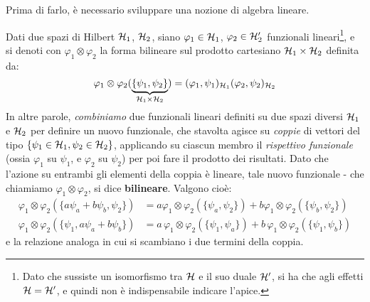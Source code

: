 \documentclass[../../FisicaTeorica.tex]{subfiles}
\begin{document}
\begin{comment}
Partendo da due particelle con funzioni d'onda $\psi_1(\vec{x}^{(1)}) \in L^2(\bb{R}^3,d^3x)$  e $\psi(\vec{x}^{(2)})\in L^2(\bb{R}^3, d^3x)$, il sistema composto da entrambe avrà una funzione d'onda $\psi(\vec{x}^{(1)}, \vec{x}^{(2)}) \in L^2(\bb{R}^6, d^3x^{(1)},d^3x^{(2)})$. Qual è la relazione tra quest'ultima $\psi$ \q{composta} e le due \q{singole}?\\
\end{comment}
Prima di farlo, è necessario sviluppare una nozione di algebra lineare.\\
\begin{dfn}
Dati due spazi di Hilbert $\mathcal{H}_1$, $\mathcal{H}_2$, siano $\varphi_1 \in \mathcal{H}_1$, $\varphi_2\in \mathcal{H}_2'$ funzionali lineari\footnote{Dato che sussiste un isomorfismo tra $\mathcal{H}$ e il suo duale $\mathcal{H}'$, si ha che agli effetti $\mathcal{H}=\mathcal{H}'$, e quindi non è indispensabile indicare l'apice.}, e si denoti con $\varphi_1 \otimes \varphi_2$ la forma bilineare sul prodotto cartesiano $\mathcal{H}_1 \times \mathcal{H}_2$ definita da:
\begin{equation}
\varphi_1 \otimes \varphi_2 (\underbrace{\{\psi_1, \psi_2\}}_{\mathcal{H}_1 \times \mathcal{H}_2})=(\varphi_1, \psi_1)_{\mathcal{H}_1} (\varphi_2, \psi_2)_{\mathcal{H}_2}
\label{eqn:forma-bilineare}
\end{equation}
In altre parole, \textit{combiniamo} due funzionali lineari definiti su due spazi diversi $\mathcal{H}_1$ e $\mathcal{H}_2$ per definire un nuovo funzionale, che stavolta agisce su \textit{coppie} di vettori del tipo $\{\psi_1 \in \mathcal{H}_1, \psi_2 \in \mathcal{H}_2\}$, applicando su ciascun membro il \textit{rispettivo funzionale} (ossia $\varphi_1$ su $\psi_1$, e $\varphi_2$ su $\psi_2$) per poi fare il prodotto dei risultati. Dato che l'azione su entrambi gli elementi della coppia è lineare, tale nuovo funzionale - che chiamiamo $\varphi_1 \otimes \varphi_2$, si dice \textbf{bilineare}. Valgono cioè:
\begin{align*}
\varphi_1 \otimes \varphi_2(\{a\psi_a + b\psi_b,\psi_2\})&=a\varphi_1\otimes\varphi_2(\{\psi_a,\psi_2\}) + b \varphi_1 \otimes \varphi_2(\{\psi_b,\psi_2\})\\
\varphi_1\otimes \varphi_2(\{\psi_1, a\psi_a+b\psi_b\})&=a\,\varphi_1\otimes\varphi_2(\{\psi_1,\psi_a\})+b\,\varphi_1\otimes\varphi_2(\{\psi_1,\psi_b\})
\end{align*}
e la relazione analoga in cui si scambiano i due termini della coppia.\\


\end{dfn}
\end{document}
